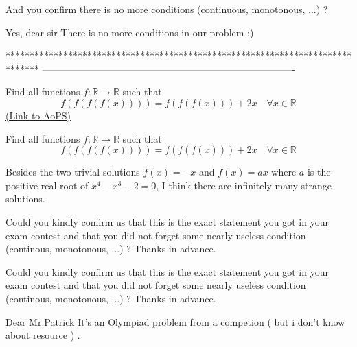 \begin{solution}
	\begin{tcolorbox}
And you confirm there is no more conditions (continuous, monotonous, ...) ?\end{tcolorbox}
Yes, dear sir 
There is no more conditions in our problem :)
\end{solution}
*******************************************************************************
-------------------------------------------------------------------------------

\begin{problem}
	Find all  functions $f: \mathbb R\to\mathbb R$  such that 
\[f(f(f(f(x)))) = f(f(f(x))) + 2x  \quad \forall x\in\mathbb R\]
	\flushright \href{https://artofproblemsolving.com/community/c6h566573}{(Link to AoPS)}
\end{problem}



\begin{solution}
	\begin{tcolorbox}Find all  functions $f: \mathbb R\to\mathbb R$  such that 
\[f(f(f(f(x)))) = f(f(f(x))) + 2x  \quad \forall x\in\mathbb R\]\end{tcolorbox}
Besides the two trivial solutions $f(x)=-x$ and $f(x)=ax$ where $a$ is the positive real root of $x^4-x^3-2=0$, I think there are infinitely many strange solutions.


Could you kindly confirm us that this is the exact statement you got in your exam \/ contest and that you did not forget some nearly useless condition (continous, monotonous, ...) ?
Thanks in advance.
\end{solution}



\begin{solution}
	\begin{tcolorbox}
Could you kindly confirm us that this is the exact statement you got in your exam \/ contest and that you did not forget some nearly useless condition (continous, monotonous, ...) ?
Thanks in advance.\end{tcolorbox}
Dear Mr.Patrick
 It's an Olympiad problem from a competion ( but i don't know about resource ) .
\end{solution}



